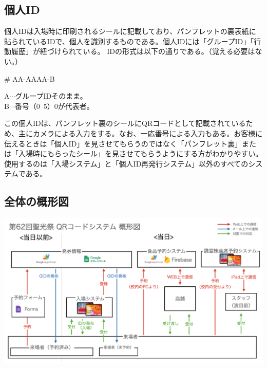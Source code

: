 \documentclass[dvipdfmx,jb5]{jarticle}
\begin{document}
 \subsection{個人ID}
 個人IDは入場時に印刷されるシールに記載しており、パンフレットの裏表紙に貼られているIDで、個人を識別するものである。個人IDには「グループID」「行動履歴」が紐づけられている。
 IDの形式は以下の通りである。（覚える必要はない。）
 \begin{screen}
 \begin{center}
 {\huge \# AA-AAAA-B}\\
 \end{center}
A$\cdots$グループIDそのまま。\\
B$\cdots$番号（0~5）0が代表者。
\end{screen}
この個人IDは、パンフレット裏のシールにQRコードとして記載されているため、主にカメラによる入力をする。なお、一応番号による入力もある。お客様に伝えるときは「個人ID」を見させてもらうのではなく「パンフレット裏」または「入場時にもらったシール」を見させてもらうようにする方がわかりやすい。使用するのは「入場システム」と「個人ID再発行システム」以外のすべてのシステムである。
\subsection{全体の概形図}
 \includegraphics[scale=0.15]{assets/qrcode-system-first-look.png}
\end{document}
